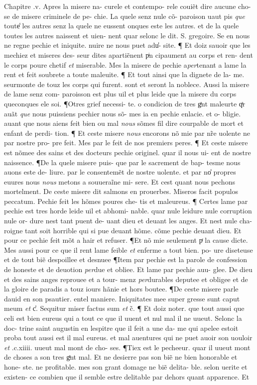 \documentclass{article}
\begin{document}
\begin{pages}
Chapitre .v. Apres la misere na- curele et contempo- rele couiẽt dire aucune cho- se de misere criminele de pe- chie. La quele senz nule cõ- paroison uaut pis \textit{que} toute̾ les autres senz la quele ne eussent onques este les autres. et de la quele toutes les autres naissent et uien- nent quar selonc le dit. S. gregoire. Se en nous ne regne pechie et iniquite. nuire ne nous puet adu̾- site. ¶ Et doiz sauoir que les mechiez et miseres des- seur dites apartiẽnent pͥn cipaument au corps et ren- dent le corps poure chetif \textit{et} miserable. Mes la misere de pechie a\textit{per}tenant a lame la rent et feit soubrete a toute maleuite. ¶ Et tout ainsi que la dignete de la- me. seurmonte de touz les corps qui furent. sont et seront la noblece. Aussi la misere de lame senz com- paroisson est plus uil et plus leide que la misere du corps queconques ele soi. ¶Otres grief necessi- te. o condicion de tres gͣnt maleurte qͣr auãt \textit{que} nous puissiens pechier nous sõ- mes ia en pechie enlacie. et o- bligie. auant que nous aiens feit bien ou mal \textit{nous} sõmes fil dire courpable de mort et enfant de perdi- tion. ¶ Et ceste misere \textit{nous} encorons nõ mie par nr̃e uolente ne par nostre pro- pre feit. Mes par le feit de nos premiers peres. ¶ Et ceste misere est nõmee des sains et des docteurs pechie originel. quar il nous ui- ent de nostre naissence. ¶De la quele misere puis- que par le sacrement de bap- tesme nous auons este de- liure. par le consentemẽt de nostre uolente. et par no̾ propres euures nous \textit{nous} metons a souueraĩne mi- sere. Et cest quant nous pechons mortelment. De ceste misere dit salmons en prouerbes. Miseros facit populos peccatum. Pechie feit les hõmes poures che- tis et maleureus. ¶ Certes lame par pechie est tres horde leide uil et abhomi- nable. quar nule leidure nule corruption nule or- dure nest tant puent de- uant dieu et deuant les anges. Et nest nule cha- roigne tant soit horrible qui si pue deuant hõme. cõme pechie deuant dieu. Et pour ce pechie feit mõt a hair et refuser. ¶Et nõ mie seulement pͬ la cause dicte. Mes aussi pour ce que il rent lame feible \textit{et} enferme a tout bien. po- ure diseteuse et de tout biẽ despoillee et desnuee ¶Item par pechie est la parole de confession de honeste et de deuotion \textit{per}due et obliee. Et lame par pechie auu- glee. De dieu et des sains anges reprouee et a tour- menz \textit{per}durables deputee et obligee et de la gloire de paradis a touz iours hãnie et hors boutee. ¶De ceste misere parle dauid en son psautier. entel maniere. Iniquitates mee super gresse sunt caput meum \textit{et} c̾. Sequitur miser factus sum \textit{et} c̃. ¶ Et doiz noter. que tout aussi que celi est bien eureus qui a tout ce que il uuent et nul mal il ne uueut. Selonc la doc- trine saint augustin en lespitre que il feit a une da- me qui apelee estoit proba tout aussi est il mal eureus. et mal auentures qui ne puet auoir son uouloir \textit{et} .c.xiiii. uueut mal mont de cho- ses. ¶Tiex est le pecheeur. quar il uueut mont de choses a son tres gͣnt mal. Et ne desierre pas son biẽ ne bien honorable et hone- ste. ne profitable. mes son grant domage ne biẽ delita- ble. selon uerite et existen- ce combien que il semble estre delitable par dehors quant apparence. Et 
\end{pages}
\end{document}
